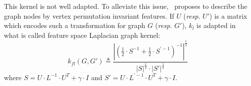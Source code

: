                     This kernel is not well adapted.
                    To alleviate this issue,~\textcite{kondor2016multiscale} proposes to describe the graph nodes by vertex permutation invariant features.
                    If $U$ (\textit{resp.} $U'$) is a matrix which encodes such a transformation for graph $G$ (\textit{resp.} $G'$), $k_{l}$ is adapted in what is called feature space Laplacian graph kernel:
                    \begin{equation}
                        \label{eq::feature_laplacian_kernel}
                        k_{fl}(G, G') \triangleq \frac{\left\lvert \left(\frac{1}{2} \cdot S^{-1} + \frac{1}{2} \cdot S^{\prime -1} \right)^{-1} \right\rvert^{\frac{1}{2}}}{\left\lvert S\right\rvert^{\frac{1}{4}}\cdot\left\lvert S' \right\rvert^{\frac{1}{4}}}
                    \end{equation}
                    where $S = U\cdot L^{-1}\cdot U^T + \gamma \cdot I$ and $S' = U\cdot L^{\prime -1}\cdot U^T + \gamma \cdot I$.\\

